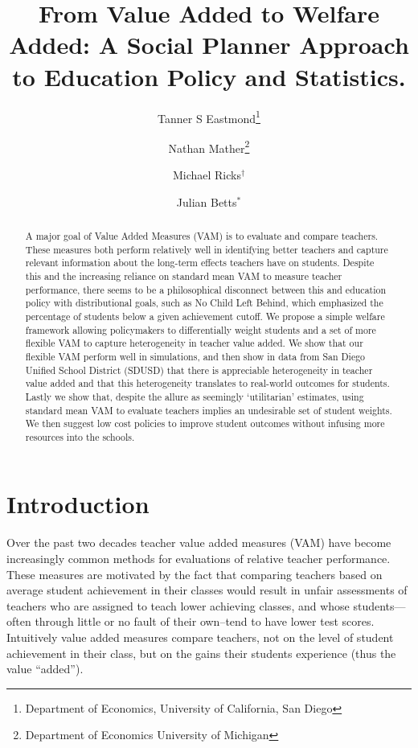 \documentclass[letterpaper,12pt]{article}
\title{From Value Added to Welfare Added: A Social Planner Approach to Education Policy and Statistics.}
\author{Tanner S Eastmond\thanks{Department of Economics, University of California, San Diego} \and Nathan Mather\thanks{Department of Economics University of Michigan} \and Michael Ricks$^\dagger$ \and Julian Betts$^*$}
\date{\vspace{-8ex}}
\begin{document}
\maketitle





\begin{abstract}
    A major goal of Value Added Measures (VAM) is to evaluate and compare teachers. These measures both perform relatively well in identifying better teachers and capture relevant information about the long-term effects teachers have on students. Despite this and the increasing reliance on standard mean VAM to measure teacher performance, there seems to be a philosophical disconnect between this and education policy with distributional goals, such as No Child Left Behind, which emphasized the percentage of students below a given achievement cutoff. We propose a simple welfare framework allowing policymakers to differentially weight students and a set of more flexible VAM to capture heterogeneity in teacher value added. We show that our flexible VAM perform well in simulations, and then show in data from San Diego Unified School District (SDUSD) that there is appreciable heterogeneity in teacher value added and that this heterogeneity translates to real-world outcomes for students. Lastly we show that, despite the allure as seemingly `utilitarian' estimates, using standard mean VAM to evaluate teachers implies an undesirable set of student weights. We then suggest low cost policies to improve student outcomes without infusing more resources into the schools.
\end{abstract}





\section{Introduction}

Over the past two decades teacher value added measures (VAM) have become increasingly common methods for evaluations of relative teacher performance. These measures are motivated by the fact that comparing teachers based on average student achievement in their classes would result in unfair assessments of teachers who are assigned to teach lower achieving classes, and whose students---often through little or no fault of their own--tend to have lower test scores. Intuitively value added measures compare teachers, not on the level of student achievement in their class, but on the gains their students experience (thus the value ``added'').
\end{document}
